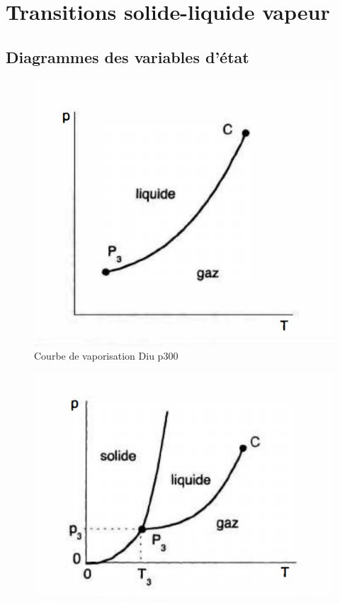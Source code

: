 \documentclass[10pt]{beamer}
\begin{document}
\section{Transitions solide-liquide vapeur}
\subsection{Diagrammes des variables d'état}

\begin{frame}{\insertsubsection}
    \begin{minipage}{.48\linewidth}
    \begin{figure}
        \centering
        \includegraphics[width=1\textwidth]{Courbe_vaporisation_Diu.png}
        \caption{Courbe de vaporisation Diu p300}
    \end{figure}
    \end{minipage}
    \begin{minipage}{.48\linewidth}
    \begin{figure}
        \centering
        \includegraphics[width=1.1\textwidth]{Diagramme_corps_purs.png}

\end{figure}
\end{minipage}
\end{frame}
\end{document}
